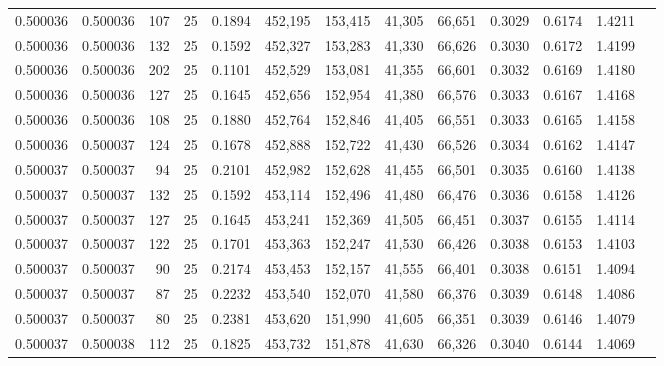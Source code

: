 \begin{tabular}{rrrrrrrrrrrrr}
0.500036 & 0.500036 &   107 &  25 &                                     0.1894 & 452,195 & 153,415 &  41,305 &  66,651 & 0.3029 & 0.6174 & 1.4211 \\
0.500036 & 0.500036 &   132 &  25 &                                     0.1592 & 452,327 & 153,283 &  41,330 &  66,626 & 0.3030 & 0.6172 & 1.4199 \\
0.500036 & 0.500036 &   202 &  25 &                                     0.1101 & 452,529 & 153,081 &  41,355 &  66,601 & 0.3032 & 0.6169 & 1.4180 \\
0.500036 & 0.500036 &   127 &  25 &                                     0.1645 & 452,656 & 152,954 &  41,380 &  66,576 & 0.3033 & 0.6167 & 1.4168 \\
0.500036 & 0.500036 &   108 &  25 &                                     0.1880 & 452,764 & 152,846 &  41,405 &  66,551 & 0.3033 & 0.6165 & 1.4158 \\
0.500036 & 0.500037 &   124 &  25 &                                     0.1678 & 452,888 & 152,722 &  41,430 &  66,526 & 0.3034 & 0.6162 & 1.4147 \\
0.500037 & 0.500037 &    94 &  25 &                                     0.2101 & 452,982 & 152,628 &  41,455 &  66,501 & 0.3035 & 0.6160 & 1.4138 \\
0.500037 & 0.500037 &   132 &  25 &                                     0.1592 & 453,114 & 152,496 &  41,480 &  66,476 & 0.3036 & 0.6158 & 1.4126 \\
0.500037 & 0.500037 &   127 &  25 &                                     0.1645 & 453,241 & 152,369 &  41,505 &  66,451 & 0.3037 & 0.6155 & 1.4114 \\
0.500037 & 0.500037 &   122 &  25 &                                     0.1701 & 453,363 & 152,247 &  41,530 &  66,426 & 0.3038 & 0.6153 & 1.4103 \\
0.500037 & 0.500037 &    90 &  25 &                                     0.2174 & 453,453 & 152,157 &  41,555 &  66,401 & 0.3038 & 0.6151 & 1.4094 \\
0.500037 & 0.500037 &    87 &  25 &                                     0.2232 & 453,540 & 152,070 &  41,580 &  66,376 & 0.3039 & 0.6148 & 1.4086 \\
0.500037 & 0.500037 &    80 &  25 &                                     0.2381 & 453,620 & 151,990 &  41,605 &  66,351 & 0.3039 & 0.6146 & 1.4079 \\
0.500037 & 0.500038 &   112 &  25 &                                     0.1825 & 453,732 & 151,878 &  41,630 &  66,326 & 0.3040 & 0.6144 & 1.4069 \\

\end{tabular}
